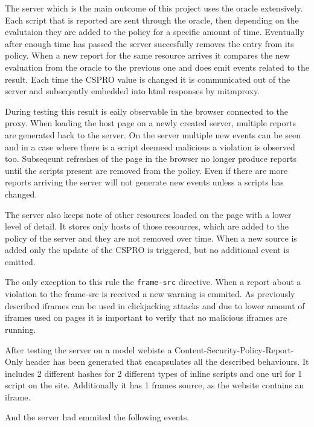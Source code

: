 The server which is the main outcome of this project uses the oracle extensively.
Each script that is reported are sent through the oracle, then depending on the evalutaion they are added to the policy for a specific amount of time.
Eventually after enough time has passed the server succesfully removes the entry from its policy.
When a new report for the same resource arrives it compares the new evaluation from the oracle to the previous one and does emit events related to the result.
Each time the CSPRO value is changed it is communicated out of the server and subseqently embedded into html responses by mitmproxy.

During testing this result is eaily observable in the browser connected to the proxy.
When loading the host page on a newly created server, multiple reports are generated back to the server.
On the server multiple new events can be seen and in a case where there is a script deemeed malicious a violation is observed too.
Subseqeunt refreshes of the page in the browser no longer produce reports until the scripts present are removed from the policy.
Even if there are more reports arriving the server will not generate new events unless a scripts has changed.

The server also keeps note of other resources loaded on the page with a lower level of detail.
It stores only hosts of those resources, which are added to the policy of the server and they are not removed over time.
When a new source is added only the update of the CSPRO is triggered, but no additional event is emitted.

The only exception to this rule the \texttt{frame-src} directive. 
When a report about a violation to the frame-src is received a new warning is emmited.
As previously described iframes can be used in clickjacking attacks and due to lower amount of iframes used on pages it is important to verify that no malicious iframes are running.

After testing the server on a model webiste a Content-Security-Policy-Report-Only header has been generated that encapsulates all the described behaviours.
It includes 2 different hashes for 2 different types of inline scripts and one url for 1 script on the site.
Additionally it has 1 frames source, as the website contains an iframe.



And the server had emmited the following events.



